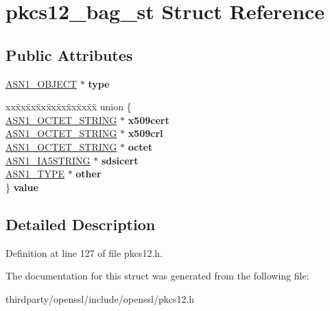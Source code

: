 \hypertarget{structpkcs12__bag__st}{}\section{pkcs12\+\_\+bag\+\_\+st Struct Reference}
\label{structpkcs12__bag__st}
\subsection*{Public Attributes}
\begin{DoxyCompactItemize}
\item 
\mbox{\label{structpkcs12__bag__st_a6f70869478b661dce62ea8f340d15086}} 
\hyperlink{structasn1__object__st}{A\+S\+N1\+\_\+\+O\+B\+J\+E\+CT} $\ast$ {\bfseries type}
\item 
\mbox{\label{structpkcs12__bag__st_acb778678a1dfb53f855207e6486404e7}} 
\begin{tabbing}
xx\=xx\=xx\=xx\=xx\=xx\=xx\=xx\=xx\=\kill
union \{\\
\>\hyperlink{structasn1__string__st}{ASN1\_OCTET\_STRING} $\ast$ {\bfseries x509cert}\\
\>\hyperlink{structasn1__string__st}{ASN1\_OCTET\_STRING} $\ast$ {\bfseries x509crl}\\
\>\hyperlink{structasn1__string__st}{ASN1\_OCTET\_STRING} $\ast$ {\bfseries octet}\\
\>\hyperlink{structasn1__string__st}{ASN1\_IA5STRING} $\ast$ {\bfseries sdsicert}\\
\>\hyperlink{structasn1__type__st}{ASN1\_TYPE} $\ast$ {\bfseries other}\\
\} {\bfseries value}\\

\end{tabbing}\end{DoxyCompactItemize}


\subsection{Detailed Description}


Definition at line 127 of file pkcs12.\+h.



The documentation for this struct was generated from the following file\+:\begin{DoxyCompactItemize}
\item 
thirdparty/openssl/include/openssl/pkcs12.\+h\end{DoxyCompactItemize}
